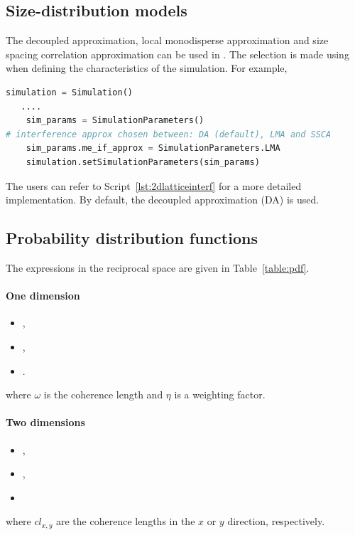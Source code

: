 \subsection{Size-distribution models}
The decoupled approximation, local monodisperse approximation and size spacing correlation approximation can be used in \BornAgain.
The selection is made using  when defining the characteristics of the simulation.  For example,
\begin{lstlisting}[language=python, style=eclipseboxed,numbers=none,nolol]
    simulation = Simulation()
   ....
    sim_params = SimulationParameters()
# interference approx chosen between: DA (default), LMA and SSCA
    sim_params.me_if_approx = SimulationParameters.LMA
    simulation.setSimulationParameters(sim_params)
\end{lstlisting}

The users can refer to Script~\ref{lst:2dlatticeinterf} for a more detailed implementation. By default, the decoupled approximation (DA) is used.

\subsection{Probability distribution functions}\label{baftd}
The expressions in the reciprocal space are given in Table~\ref{table:pdf}.

\paragraph{One dimension}
\begin{itemize}
\item {},
\item {},
\item {}.
\end{itemize}
where $\omega$ is the coherence length and $\eta$ is a weighting factor.

\paragraph{Two dimensions}

\begin{itemize}
\item {},
\item {},
\item {}
\end{itemize}
where $cl_{x,y}$ are the coherence lengths in the $x$ or $y$ direction, respectively.

